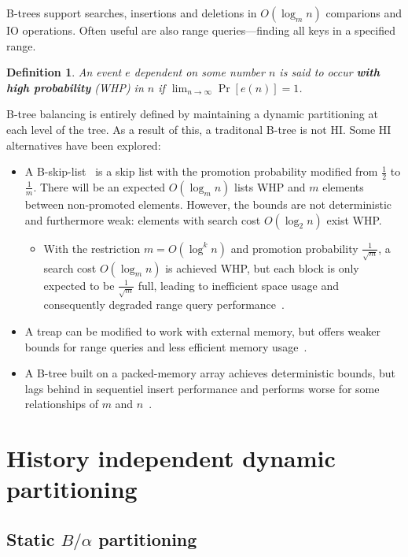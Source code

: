 \documentclass{article}
\newtheorem{definition}{Definition}
\begin{document}
B-trees support searches, insertions and deletions in $O(\log_m n)$ comparions and IO operations. Often useful are also range queries---finding all keys in a specified range.

\begin{definition}
    An event $e$ dependent on some number $n$ is said to occur \textbf{with high probability} (WHP) in $n$ if $\lim_{n \to \infty} \Pr\left[ e(n) \right] = 1$.
\end{definition}

B-tree balancing is entirely defined by maintaining a dynamic partitioning at each level of the tree. As a result of this, a traditonal B-tree is not HI. Some HI alternatives have been explored:

\begin{itemize}
    \item A B-skip-list~\cite{Bskip} is a skip list with the promotion probability modified from $\frac{1}{2}$ to $\frac{1}{m}$. There will be an expected $O(\log_m n)$ lists WHP and $m$ elements between non-promoted elements. However, the bounds are not deterministic and furthermore weak: elements with search cost $O(\log_2 n)$ exist WHP.

    \begin{itemize}
	\item With the restriction $m = O(\log^k n)$ and promotion probability $\frac{1}{\sqrt{m}}$, a search cost $O(\log_m n)$ is achieved WHP, but each block is only expected to be $\frac{1}{\sqrt{m}}$ full, leading to inefficient space usage and consequently degraded range query performance~\cite{Bskiprest}.
    \end{itemize}

    \item A treap can be modified to work with external memory, but offers weaker bounds for range queries and less efficient memory usage~\cite{Bskip}.

    \item A B-tree built on a packed-memory array achieves deterministic bounds, but lags behind in sequentiel insert performance and performs worse for some relationships of $m$ and $n$~\cite{Bskiprest}.
\end{itemize}

\section{History independent dynamic partitioning}

\subsection{Static $B/\alpha$ partitioning}
\end{document}
